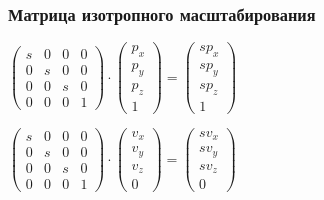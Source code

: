 \documentclass[10pt]{beamer}
\begin{document}
\begin{frame}[fragile]
\frametitle{Матрица изотропного масштабирования}
\begin{center}
\begin{math}
\begin{pmatrix}
s & 0 & 0 & 0 \\
0 & s & 0 & 0 \\
0 & 0 & s & 0 \\
0 & 0 & 0 & 1
\end{pmatrix}
\cdot
\begin{pmatrix}
p_x \\
p_y \\
p_z \\
1
\end{pmatrix}
=
\begin{pmatrix}
s p_x\\
s p_y\\
s p_z\\
1
\end{pmatrix}
\end{math}

\begin{math}
\begin{pmatrix}
s & 0 & 0 & 0 \\
0 & s & 0 & 0 \\
0 & 0 & s & 0 \\
0 & 0 & 0 & 1
\end{pmatrix}
\cdot
\begin{pmatrix}
v_x \\
v_y \\
v_z \\
0
\end{pmatrix}
=
\begin{pmatrix}
s v_x\\
s v_y\\
s v_z\\
0
\end{pmatrix}
\end{math}
\end{center}
\end{frame}
\end{document}
